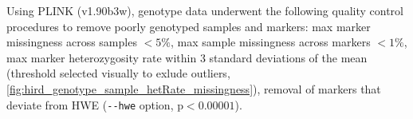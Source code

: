 Using PLINK (v1.90b3w), genotype data underwent the following quality control procedures to remove poorly genotyped samples and markers:
max marker missingness across samples $< 5\%$, 
max sample missingness across markers $< 1\%$, 
max marker heterozygosity rate within 3 standard deviations of the mean (threshold selected visually to exlude outliers, \autoref{fig:hird_genotype_sample_hetRate_missingness}),
removal of markers that deviate from \gls{HWE} (\texttt{-{}-hwe} option, $\text{p} < 0.00001$).
  

